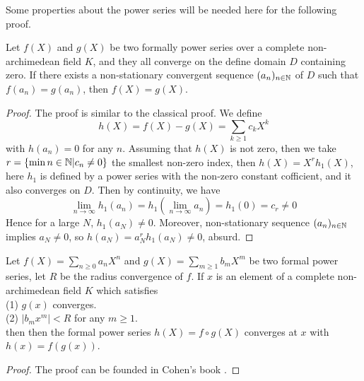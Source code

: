 Some properties about the power series will be needed here for the following proof.
\begin{lemma} \label{cont}
    Let \(f(X)\) and \(g(X)\) be two formally power series over a complete non-archimedean field \(K\), and they all converge on the define domain \(D\) containing zero. If there exists a non-stationary convergent sequence \((a_n)_{n \in \mathbb{N}}\) of \(D\) such that \(f(a_n)=g(a_n)\), then \(f(X) = g(X)\).

    \begin{proof}
        The proof is similar to the classical proof. We define
        \[h(X) = f(X)-g(X) = \sum_{k\geq 1} c_k X^k\]
        with \(h(a_n) = 0\) for any \(n\). Assuming that \(h(X)\) is not zero, then we take \(r = \{\min{n \in \mathbb{N}| c_n \neq 0}\}\) the smallest non-zero index, then \(h(X)=X^rh_1(X)\), here \(h_1\) is defined by a power series with the non-zero constant cofficient, and it also converges on \(D\). Then by continuity, we have
        \[ \lim_{n \rightarrow \infty} h_1(a_n) = h_1(\lim_{n \rightarrow \infty}a_n) = h_1(0) = c_r \neq 0\]
        Hence for a large \(N\), \(h_1(a_N) \neq 0\). Moreover, non-stationary sequence \((a_n)_{n\in \mathbb{N}}\) implies \(a_N \neq 0\), so \(h(a_N) = a_N^rh_1(a_N)\neq 0\), absurd.
    \end{proof}

    \begin{lemma}[composition] \label{composition}
        Let \(f(X) = \sum_{n \geq 0} a_nX^n\) and \(g(X) = \sum_{m\geq 1}b_mX^m\) be two formal power series, let \(R\) be the radius convergence of \(f\). If \(x\) is an element of a complete non-archimedean field \(K\) which satisfies\\
        (1) \(g(x)\) converges. \\
        (2) \(|b_mx^m| < R\) for any \(m \geq 1\). \\
        then then the formal power series \(h(X) = f\circ g (X)\) converges at \(x\) with \(h(x)=f(g(x))\).

        \begin{proof}
            The proof can be founded in Cohen's book \cite[Chapter 4, proposition 4.2.7]{cohen2007number}.
        \end{proof}
    \end{lemma}
\end{lemma}

